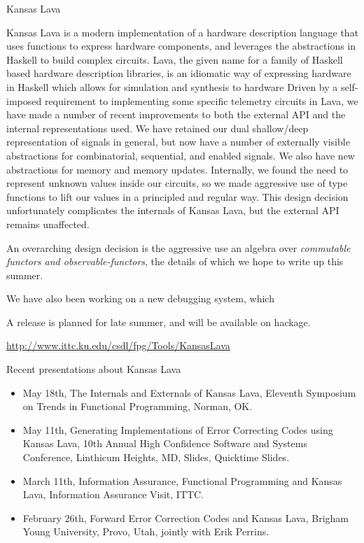\documentclass{scrreprt}
\begin{document}
\begin{hcarentry}{Kansas Lava}
\makeheader

Kansas Lava is a modern implementation of a hardware description language
that uses functions to express hardware components,
and leverages the abstractions in Haskell to build complex circuits. 
Lava, 
the given name for a family of Haskell based hardware description libraries,
is an idiomatic way of expressing hardware in Haskell which allows for simulation and
synthesis to hardware
Driven by a self-imposed requirement to implementing some specific telemetry circuits in Lava,
we have made a number of recent improvements to both the external API
and the internal representations used. 
We have retained our dual shallow/deep
representation of signals in general, but now have a number of externally visible
abstractions for combinatorial, sequential, and enabled signals.
We also have new abstractions for memory and memory updates.
Internally, we found the need to represent unknown values inside our circuits, 
so we made aggressive use of type functions to lift our values in a principled
and regular way. This design decision unfortunately 
complicates the internals of Kansas Lava, but the external
API remains unaffected.

An overarching design decision is the aggressive use an algebra over {\em commutable functors and observable-functors\/}, the details of which we hope to write up this summer.

We have also been working on a new debugging system, which 

A release is planned for late summer, and will be available on hackage.

\FurtherReading
  \url{http://www.ittc.ku.edu/csdl/fpg/Tools/KansasLava}

Recent presentations about Kansas Lava
\begin{itemize}
\item May 18th, The Internals and Externals of Kansas Lava, Eleventh Symposium on Trends in Functional Programming, Norman, OK.
\item May 11th, Generating Implementations of Error Correcting Codes using Kansas Lava, 10th Annual High Confidence  Software and Systems Conference, Linthicum Heights, MD, Slides, Quicktime Slides.
\item March 11th, Information Assurance, Functional Programming and Kansas Lava, Information Assurance Visit, ITTC.
\item February 26th, Forward Error Correction Codes and Kansas Lava, Brigham Young University, Provo, Utah, jointly with Erik Perrins. 
\end{itemize}

\end{hcarentry}
\end{document}
